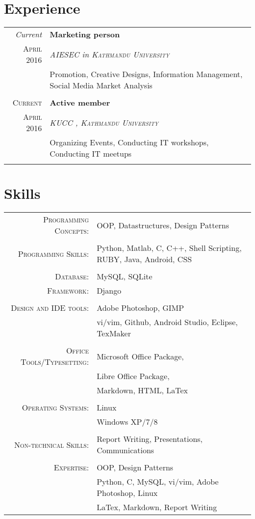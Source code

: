 \documentclass[a4paper,10pt]{article}
\begin{document}
\section{Experience}
\begin{tabular}{r|p{11cm}}
 \emph{Current} & \textbf{Marketing person}\\ \textsc{April 2016} & \emph{\textsc{AIESEC} in \textsc{Kathmandu University}} \\&\footnotesize{Promotion, Creative Designs, Information Management, Social Media Market Analysis}\\\multicolumn{2}{c}{} \\
 \textsc{Current} & \textbf{Active member} \\ \textsc{April 2016} &\emph{\textsc{KUCC} , \textsc{Kathmandu University}}\\&\footnotesize{Organizing Events, Conducting IT workshops, Conducting IT meetups}\\\multicolumn{2}{c}{} 
\end{tabular}

\section{Skills}
\begin{tabular}{rl}	
\textsc{Programming Concepts:} &OOP, Datastructures, Design Patterns \\\\
\textsc{Programming Skills:}  & Python, Matlab, C, C++, Shell Scripting, RUBY, Java, Android, CSS\\\\
\textsc{Database:} & MySQL, SQLite\\
\textsc{Framework:} &Django\\\\
\textsc{Design and IDE tools:} & Adobe Photoshop, GIMP\\
							   & vi/vim, Github, Android Studio, Eclipse, TexMaker\\\\

\textsc{Office Tools/Typesetting:} & Microsoft Office Package,\\
								   & Libre Office Package,\\
								   & Markdown, HTML, LaTex\\\\
								   
\textsc{Operating Systems:} &Linux\\
							&Windows XP/7/8\\\\
							

\textsc{Non-technical Skills:} &Report Writing, Presentations, Communications\\\\
\textsc{Expertise:} &OOP, Design Patterns\\
					&Python, C, MySQL, vi/vim, Adobe Photoshop, Linux \\
					& LaTex, Markdown, Report Writing
							 

\end{tabular}
\end{document}
